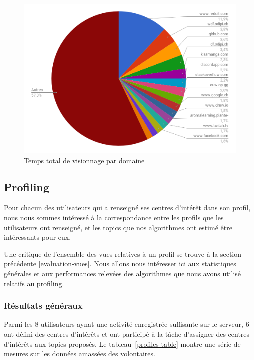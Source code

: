 	\begin{figure}[!h]
		\centering
		\includegraphics[height=0.75\textwidth]{images/results/temps_total_visionnage}
		\caption{Temps total de visionnage par domaine}
		\label{r-visionnage}
	\end{figure}


%
%
%
%
%
%

	\subsection{Profiling}

		Pour chacun des utilisateurs qui a renseigné ses centres d'intérêt dans son profil, nous nous sommes intéressé à la correspondance entre les profils que les utilisateurs ont renseigné, et les topics que nos algorithmes ont estimé être intéressants pour eux.

		Une critique de l'ensemble des vues relatives à un profil se trouve à la section précédente \ref{evaluation-vues}. Nous allons nous intéresser ici aux statistiques générales et aux performances relevées des algorithmes que nous avons utilisé relatifs au profiling.

		\subsubsection{Résultats généraux}

			Parmi les 8 utilisateurs aynat une activité enregistrée suffisante sur le serveur, 6 ont défini des centres d'intérêts et ont participé à la tâche d'assigner des centres d'intérêts aux topics proposés. Le tableau~\ref{profiles-table} montre une série de mesures sur les données amassées des volontaires.

